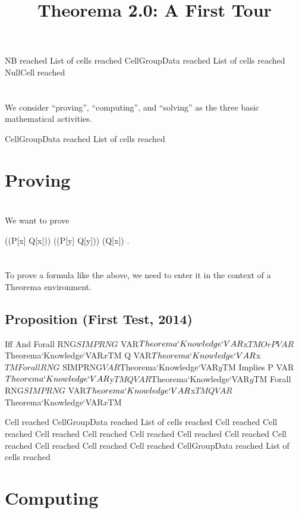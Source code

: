 \documentclass{article}
\newcommand{\light}[1]{{\color{lightgray}#1}}
\begin{document}
% 

\title{Theorema 2.0: A First Tour}
\author{}
\date{}
\maketitle

\light{NB reached} \light{List of cells reached} \light{CellGroupData reached} \light{List of cells reached} Null\light{Cell reached} \begingroup \section*{} We consider “proving”, “computing”, and “solving” as the three basic mathematical activities.\endgroup 

\light{CellGroupData reached} \light{List of cells reached} \section{Proving}

\begingroup \section*{} We want to prove\endgroup 

\begin{center}((P[x] \lor Q[x])) \land ((P[y] \Rightarrow Q[y])) \Leftrightarrow (Q[x]) .\end{center}
\begingroup \section*{} To prove a formula like the above, we need to enter it in the context of a Theorema environment.\endgroup 

\begin{openenvironment}
\end{openenvironment}\begin{tmaenvironment}
\subsection{Proposition (First Test, 2014)}
 Iff And Forall RNG$ SIMPRNG$ VAR$Theorema`Knowledge`VAR$x$TM Or P VAR$Theorema`Knowledge`VAR$x$TM Q VAR$Theorema`Knowledge`VAR$x$TM Forall RNG$ SIMPRNG$ VAR$Theorema`Knowledge`VAR$y$TM Implies P VAR$Theorema`Knowledge`VAR$y$TM Q VAR$Theorema`Knowledge`VAR$y$TM Forall RNG$ SIMPRNG$ VAR$Theorema`Knowledge`VAR$x$TM Q VAR$Theorema`Knowledge`VAR$x$TM\end{tmaenvironment}
\light{Cell reached} \light{CellGroupData reached} \light{List of cells reached} \light{Cell reached} \light{Cell reached} \light{Cell reached} \light{Cell reached} \light{Cell reached} \light{Cell reached} \light{Cell reached} \light{Cell reached} \light{Cell reached} \light{Cell reached} \light{Cell reached} \light{CellGroupData reached} \light{List of cells reached} \section{Computing}
\end{document}
